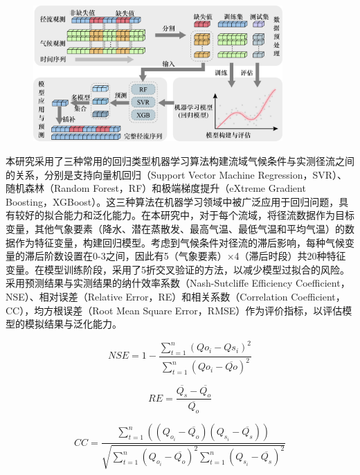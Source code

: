 \begin{figure}[H]
	\centering
	\includegraphics[width=0.85\textwidth]{figures/chap3/0_Interp_Framework.jpg}
	\label{fig:Interp_Framework}
\end{figure}

本研究采用了三种常用的回归类型机器学习算法构建流域气候条件与实测径流之间的关系，分别是支持向量机回归（Support Vector Machine Regression，SVR）、随机森林（Random Forest，RF）和极端梯度提升（eXtreme Gradient Boosting，XGBoost）。这三种算法在机器学习领域中被广泛应用于回归问题，具有较好的拟合能力和泛化能力。在本研究中，对于每个流域，将径流数据作为目标变量，其他气象要素（降水、潜在蒸散发、最高气温、最低气温和平均气温）的数据作为特征变量，构建回归模型。考虑到气候条件对径流的滞后影响，每种气候变量的滞后阶数设置在0-3之间，因此有5（气象要素）×4（滞后时段）共20种特征变量。在模型训练阶段，采用了5折交叉验证的方法，以减少模型过拟合的风险。采用预测结果与实测结果的纳什效率系数（Nash-Sutcliffe Efficiency Coefficient，NSE）、相对误差（Relative Error，RE）和相关系数（Correlation Coefficient，CC），均方根误差（Root Mean Square Error，RMSE）作为评价指标，以评估模型的模拟结果与泛化能力。

\begin{equation}
    \label{equ:NSE}
	NSE=1-\frac{\sum_{t=1}^{n}\left(Q o_{i}-Q s_{i}\right)^{2}}{\sum_{t=1}^{n}\left(Q o_{i}-\overline{Q o}\right)^{2}}
\end{equation}

\begin{equation}
    \label{equ:RE}
	RE=\frac{\overline{Q_s}-\overline{Q_o}}{\overline{Q_o}}
\end{equation}

\begin{equation}
    \label{equ:CC}
	CC=\frac{\sum_{t=1}^{n}((Q_{o_i}-\overline{Q_o})(Q_{s_i}-\overline{Q_s}))}{\sqrt{\sum_{t=1}^{n}(Q_{o_i}-\overline{Q_o})^2\sum_{t=1}^{n}(Q_{s_i}-\overline{Q_s})^2}} 
\end{equation}

